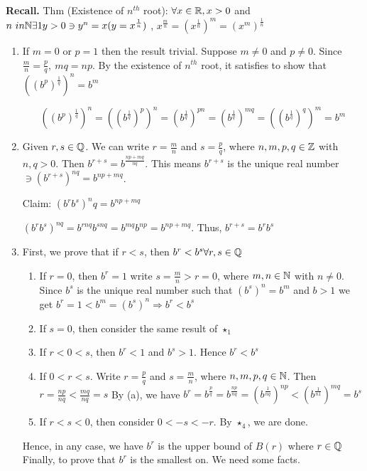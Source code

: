 \begin{solution}
	\textbf{Recall.} Thm (Existence of $n^{th}$ root): $\forall x \in \mathbb{R}, x > 0$ and $n \ in \mathbb{N} \exists 1 y > 0 \ni y^n = x(y = x^{\frac{1}{n}})$ , $x^{\frac{m}{n}} = (x^{\frac{1}{n}})^m = (x^m)^{\frac{1}{n}}$
	
	\begin{enumerate}
		\item If $m=0$ or $p = 1$ then the result trivial. Suppose $m \neq 0$ and $p \neq 0$. Since $\frac{m}{n} = \frac{p}{q},~mq = np$. By the existence of $n^{th}$ root, it satisfies to show that $((b^p)^{\frac{1}{q}})^n = b^m$
		
		$$((b^p)^{\frac{1}{q}})^n = ((b^{\frac{1}{q}})^p)^n = (b^{\frac{1}{q}})^{pn} = (b^{\frac{1}{q}})^{mq} = ((b^{\frac{1}{q}})^q)^m = b^m$$
		
		\item Given $r,s \in \mathbb{Q}$. We can write $r = \frac{m}{n}$ and $s = \frac{p}{q}$, where $n,m,p,q \in \mathbb{Z}$ with $n,q > 0$. Then $b^{r+s} = b^{\frac{np + mq}{nq}}$. This means $b^{r+s}$ is the unique real number $\ni (b^{r+s})^{nq} = b^{np + mq}$.
		 
		Claim: $(b^rb^s)^nq = b^{np + mq}$
		
		$(b^rb^s)^{nq} = b^{rnq}b^{snq} = b^{mq}b^{np} = b^{np + mq}$. Thus, $b^{r+s}=b^rb^s$
		
		\item First, we prove that if $r < s$, then $b^r < b^s \forall r,s \in \mathbb{Q}$
			\begin{enumerate}[label = $\star_{\arabic*}$]
				\item If $r = 0$, then $b^r = 1$ write $s = \frac{m}{n} > r = 0$, where $m,n \in \mathbb{N}$ with $n \neq 0$. Since $b^s$ is the unique real number such that $(b^s)^n = b^m$ and $b > 1$ we get $b^r = 1 < b^m = (b^s)^n \Rightarrow b^r < b^s$
				\item If $s = 0$, then consider the same result of $\star_1$
				\item If $r<0<s$, then $b^r < 1$ and $b^s > 1$. Hence $b^r < b^s$
				\item If $0 < r < s$. Write $r = \frac{p}{q}$ and $s = \frac{m}{n}$, where $n,m,p,q \in \mathbb{N}$. Then $r = \frac{np}{nq} < \frac{mq}{nq} = s$ By (a), we have $b^r = b^{\frac{p}{q}} = b^{\frac{np}{nq}} = (b^{\frac{1}{nq}})^{np} < (b^{\frac{1}{n1}})^{mq} = b^s$
				\item If $r<s<0$, then consider $0 < -s<-r$. By $\star_4$, we are done.
			\end{enumerate}
			Hence, in any case, we have $b^r$ is the upper bound of $B(r)$ where $r \in \mathbb{Q}$
				Finally, to prove that $b^r$ is the smallest on. We need some facts.
				

\end{enumerate}
\end{solution}
